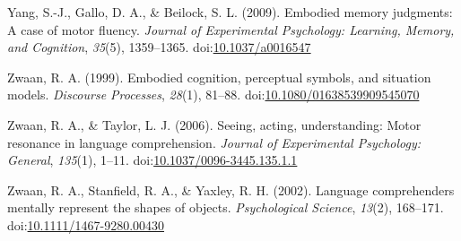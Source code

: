 \documentclass[english,man, mask]{apa6}
\theoremstyle{definition}
\theoremstyle{definition}
\theoremstyle{definition}
\theoremstyle{remark}
\begin{document}
\hypertarget{ref-Yang2009}{}
Yang, S.-J., Gallo, D. A., \& Beilock, S. L. (2009). Embodied memory
judgments: A case of motor fluency. \emph{Journal of Experimental
Psychology: Learning, Memory, and Cognition}, \emph{35}(5), 1359--1365.
doi:\href{https://doi.org/10.1037/a0016547}{10.1037/a0016547}

\hypertarget{ref-Zwaan1999}{}
Zwaan, R. A. (1999). Embodied cognition, perceptual symbols, and
situation models. \emph{Discourse Processes}, \emph{28}(1), 81--88.
doi:\href{https://doi.org/10.1080/01638539909545070}{10.1080/01638539909545070}

\hypertarget{ref-Zwaan2006}{}
Zwaan, R. A., \& Taylor, L. J. (2006). Seeing, acting, understanding:
Motor resonance in language comprehension. \emph{Journal of Experimental
Psychology: General}, \emph{135}(1), 1--11.
doi:\href{https://doi.org/10.1037/0096-3445.135.1.1}{10.1037/0096-3445.135.1.1}

\hypertarget{ref-Zwaan2002}{}
Zwaan, R. A., Stanfield, R. A., \& Yaxley, R. H. (2002). Language
comprehenders mentally represent the shapes of objects.
\emph{Psychological Science}, \emph{13}(2), 168--171.
doi:\href{https://doi.org/10.1111/1467-9280.00430}{10.1111/1467-9280.00430}
\end{document}
